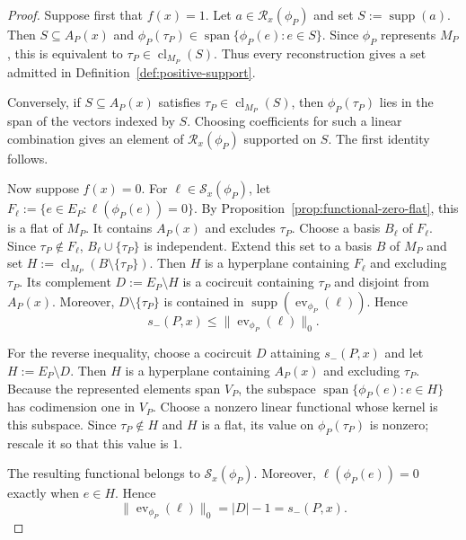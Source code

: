 \documentclass[11pt]{article}
\numberwithin{equation}{section}
\theoremstyle{remark}
\newcommand{\cl}{\operatorname{cl}}
\begin{document}
\begin{proof}
Suppose first that $f(x)=1$. Let
$a\in\mathcal R_x(\phi_P)$ and set $S:=\operatorname{supp}(a)$. Then
$S\subseteq A_P(x)$ and
$\phi_P(\tau_P)\in\operatorname{span}\{\phi_P(e):e\in S\}$. Since
$\phi_P$ represents $M_P$, this is equivalent to
$\tau_P\in\cl_{M_P}(S)$. Thus every reconstruction gives a set admitted in
Definition~\ref{def:positive-support}.

Conversely, if $S\subseteq A_P(x)$ satisfies
$\tau_P\in\cl_{M_P}(S)$, then $\phi_P(\tau_P)$ lies in the span of the
vectors indexed by $S$. Choosing coefficients for such a linear combination
gives an element of $\mathcal R_x(\phi_P)$ supported on $S$. The first
identity follows.

Now suppose $f(x)=0$. For $\ell\in\mathcal S_x(\phi_P)$, let $F_\ell:=\{e\in E_P:\ell(\phi_P(e))=0\}$.
By Proposition~\ref{prop:functional-zero-flat}, this is a flat of $M_P$.
It contains $A_P(x)$ and excludes $\tau_P$. Choose a basis
$B_\ell$ of $F_\ell$. Since $\tau_P\notin F_\ell$,
$B_\ell\cup\{\tau_P\}$ is independent. Extend this set to a basis $B$ of
$M_P$ and set $H:=\cl_{M_P}(B\setminus\{\tau_P\})$. Then $H$ is a
hyperplane containing $F_\ell$ and excluding $\tau_P$. Its complement
$D:=E_P\setminus H$ is a cocircuit containing $\tau_P$ and disjoint from
$A_P(x)$. Moreover,
$D\setminus\{\tau_P\}$ is contained in
$\operatorname{supp}(\operatorname{ev}_{\phi_P}(\ell))$. Hence
\begin{equation}
    s_-(P,x)
    \leq
    \|\operatorname{ev}_{\phi_P}(\ell)\|_0.
\end{equation}

For the reverse inequality, choose a cocircuit $D$ attaining
$s_-(P,x)$ and let $H:=E_P\setminus D$. Then $H$ is a hyperplane containing
$A_P(x)$ and excluding $\tau_P$. Because the represented elements span
$V_P$, the subspace
$\operatorname{span}\{\phi_P(e):e\in H\}$ has codimension one in $V_P$.
Choose a nonzero linear functional whose kernel is this subspace. Since
$\tau_P\notin H$ and $H$ is a flat, its value on $\phi_P(\tau_P)$ is
nonzero; rescale it so that this value is $1$.

The resulting functional belongs to $\mathcal S_x(\phi_P)$. Moreover,
$\ell(\phi_P(e))=0$ exactly when $e\in H$. Hence
\begin{equation}
    \|\operatorname{ev}_{\phi_P}(\ell)\|_0
    =
    |D|-1
    =
    s_-(P,x).
\end{equation}
\end{proof}
\end{document}

